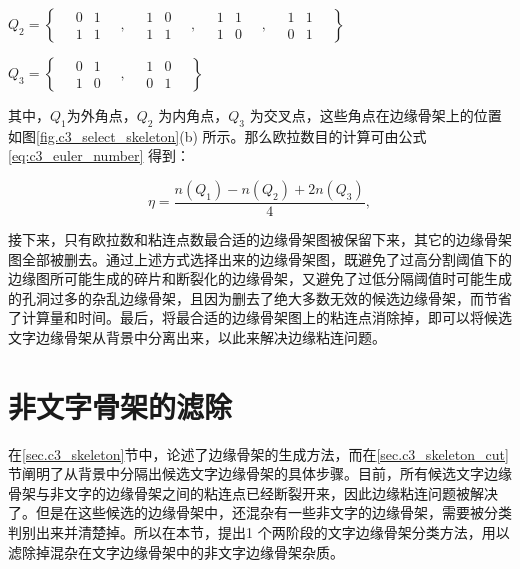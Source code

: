         $Q_2 = \left\{
        \quad
        \begin{matrix} 0 & 1 \\ 1 & 1 \end{matrix}\quad,\quad
        \begin{matrix} 1 & 0 \\ 1 & 1 \end{matrix}\quad,\quad
        \begin{matrix} 1 & 1 \\ 1 & 0 \end{matrix}\quad,\quad
        \begin{matrix} 1 & 1 \\ 0 & 1 \end{matrix}
        \quad
        \right\}$

        $Q_3 = \left\{
        \quad
        \begin{matrix} 0 & 1 \\ 1 & 0 \end{matrix}\quad,\quad
        \begin{matrix} 1 & 0 \\ 0 & 1
        \end{matrix}
        \quad
        \right\}$

        其中，$Q_1$为外角点，$Q_2$ 为内角点，$Q_3$ 为交叉点，这些角点在边缘骨架上的位置如图\ref{fig.c3_select_skeleton}(b) 所示。那么欧拉数目的计算可由公式\ref{eq:c3_euler_number} 得到：

        \begin{equation}
        \eta=\frac{n(Q_1)-n(Q_2)+2n(Q_3)}{4},
        \label{eq:c3_euler_number}
        \end{equation}

        接下来，只有欧拉数和粘连点数最合适的边缘骨架图被保留下来，其它的边缘骨架图全部被删去。通过上述方式选择出来的边缘骨架图，既避免了过高分割阈值下的边缘图所可能生成的碎片和断裂化的边缘骨架，又避免了过低分隔阈值时可能生成的孔洞过多的杂乱边缘骨架，且因为删去了绝大多数无效的候选边缘骨架，而节省了计算量和时间。最后，将最合适的边缘骨架图上的粘连点消除掉，即可以将候选文字边缘骨架从背景中分离出来，以此来解决边缘粘连问题。

    \section{非文字骨架的滤除}

    在\ref{sec.c3_skeleton}节中，论述了边缘骨架的生成方法，而在\ref{sec.c3_skeleton_cut} 节阐明了从背景中分隔出候选文字边缘骨架的具体步骤。目前，所有候选文字边缘骨架与非文字的边缘骨架之间的粘连点已经断裂开来，因此边缘粘连问题被解决了。但是在这些候选的边缘骨架中，还混杂有一些非文字的边缘骨架，需要被分类判别出来并清楚掉。所以在本节，提出1 个两阶段的文字边缘骨架分类方法，用以滤除掉混杂在文字边缘骨架中的非文字边缘骨架杂质。


